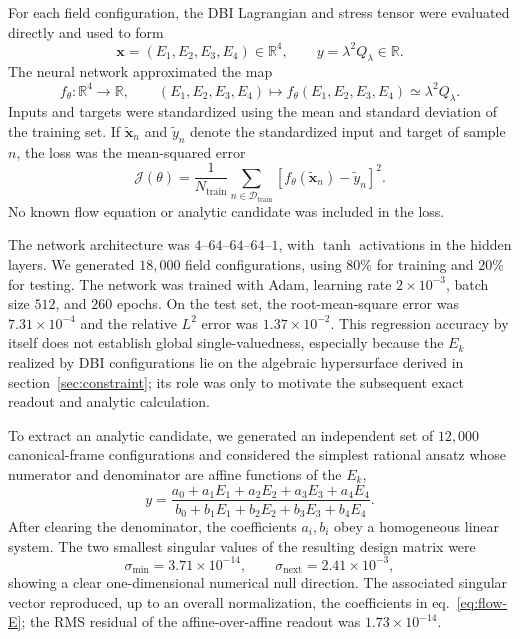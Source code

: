 \documentclass[a4paper,11pt]{article}
\numberwithin{equation}{section}
\begin{document}
For each field configuration, the DBI Lagrangian and stress tensor were evaluated directly and used to form
\begin{equation}
 \bm{x}=(E_1,E_2,E_3,E_4)\in\mathbb R^4,
 \qquad
 y=\lambda^2Q_\lambda\in\mathbb R.
 \label{eq:nn-data}
\end{equation}
The neural network approximated the map
\begin{equation}
 f_\theta:\mathbb R^4\longrightarrow\mathbb R,
 \qquad
 (E_1,E_2,E_3,E_4)\longmapsto f_\theta(E_1,E_2,E_3,E_4)\simeq\lambda^2Q_\lambda.
 \label{eq:nn-map}
\end{equation}
Inputs and targets were standardized using the mean and standard deviation of the training set. If $\widetilde{\bm{x}}_n$ and $\widetilde y_n$ denote the standardized input and target of sample $n$, the loss was the mean-squared error
\begin{equation}
 \mathcal J(\theta)
 =\frac1{N_{\mathrm{train}}}
 \sum_{n\in\mathcal D_{\mathrm{train}}}
 \left[f_\theta(\widetilde{\bm{x}}_n)-\widetilde y_n\right]^2.
 \label{eq:nn-loss}
\end{equation}
No known flow equation or analytic candidate was included in the loss.

The network architecture was $4$--$64$--$64$--$64$--$1$, with $\tanh$ activations in the hidden layers. We generated $18{,}000$ field configurations, using $80\%$ for training and $20\%$ for testing. The network was trained with Adam, learning rate $2\times10^{-3}$, batch size $512$, and $260$ epochs. On the test set, the root-mean-square error was $7.31\times10^{-4}$ and the relative $L^2$ error was $1.37\times10^{-2}$. This regression accuracy by itself does not establish global single-valuedness, especially because the $E_k$ realized by DBI configurations lie on the algebraic hypersurface derived in section~\ref{sec:constraint}; its role was only to motivate the subsequent exact readout and analytic calculation.

To extract an analytic candidate, we generated an independent set of $12{,}000$ canonical-frame configurations and considered the simplest rational ansatz whose numerator and denominator are affine functions of the $E_k$,
\begin{equation}
 y=\frac{a_0+a_1E_1+a_2E_2+a_3E_3+a_4E_4}
 {b_0+b_1E_1+b_2E_2+b_3E_3+b_4E_4}.
 \label{eq:rational-ansatz}
\end{equation}
After clearing the denominator, the coefficients $a_i,b_i$ obey a homogeneous linear system. The two smallest singular values of the resulting design matrix were
\begin{equation}
 \sigma_{\min}=3.71\times10^{-14},
 \qquad
 \sigma_{\mathrm{next}}=2.41\times10^{-3},
 \label{eq:svd-gap}
\end{equation}
showing a clear one-dimensional numerical null direction. The associated singular vector reproduced, up to an overall normalization, the coefficients in eq.~\eqref{eq:flow-E}; the RMS residual of the affine-over-affine readout was $1.73\times10^{-14}$.
\end{document}
